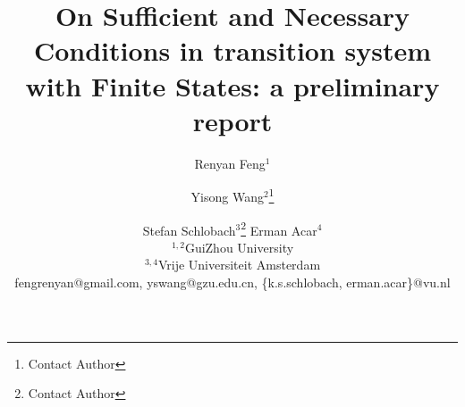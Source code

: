 \documentclass{article}
\title{On Sufficient and Necessary Conditions in transition system\\ with Finite States: a preliminary report}
\author{
Renyan Feng$^1$\and
Yisong Wang$^2$\footnote{Contact Author}\and
Stefan Schlobach$^{3}$\footnote{Contact Author}\And
Erman Acar$^4$\\
\affiliations
$^{1,2}$GuiZhou University\\
$^{3,4}$Vrije Universiteit Amsterdam\\
\emails
fengrenyan@gmail.com,
yswang@gzu.edu.cn,
\{k.s.schlobach, erman.acar\}@vu.nl
}
\begin{document}
\newcommand{\tuple}[1]{{\langle{#1}\rangle}}
\newcommand{\Mod}{\textit{Mod}}
\newcommand\ie{{\it i.e. }}
\newcommand\eg{{\it e.g.}}
\newtheorem{definition}{Definition}
\newtheorem{examp}{Example}
\newenvironment{example}{\begin{examp}\rm}{\end{examp}}
\newtheorem{lemma}{Lemma}
\newtheorem{proposition}{Proposition}
\newtheorem{theorem}{Theorem}
\newtheorem{corollary}[theorem]{Corollary}
\newenvironment{proof}{{\bf Proof:}}{\hfill\rule{2mm}{2mm}\\ }
\newcommand{\rto}{\rightarrow}
\newcommand{\lto}{\leftarrow}
\newcommand{\lrto}{\leftrightarrow}
\newcommand{\Rto}{\Rightarrow}
\newcommand{\Lto}{\Leftarrow}
\newcommand{\LRto}{\Leftrightarrow}
\newcommand{\Var}{\textit{Var}}
\newcommand{\Forget}{\textit{Forget}}
\newcommand{\KForget}{\textit{KForget}}
\newcommand{\TForget}{\textit{TForget}}
\newcommand{\Fst}{\textit{Fst}}
\newcommand{\dep}{\textit{dep}}
\newcommand{\term}{\textit{term}}
\newcommand{\literal}{\textit{literal}}

\newcommand{\Atom}{\mathcal{A}}
\newcommand{\SFive}{\textbf{S5}}
\newcommand{\MPK}{\textsc{k}}
\newcommand{\MPB}{\textsc{b}}
\newcommand{\MPT}{\textsc{t}}
\newcommand{\MPA}{\forall}
\newcommand{\MPE}{\exists}

\newcommand{\DNF}{\textit{DNF}}
\newcommand{\CNF}{\textit{CNF}}

\newcommand{\degree}{\textit{degree}}
\newcommand{\sunfold}{\textit{sunfold}}

\newcommand{\Pos}{\textit{Pos}}
\newcommand{\Neg}{\textit{Neg}}
\newcommand\wrt{{\it w.r.t.}}
\newcommand{\Hm} {{\cal M}}
\newcommand{\Hw} {{\cal W}}
\newcommand{\Hr} {{\cal R}}
\newcommand{\Hb} {{\cal B}}
\newcommand{\Ha} {{\cal A}}

\newcommand{\Dsj}{\triangledown}

\newcommand{\wnext}{\widetilde{\bigcirc}}
\newcommand{\nex}{\bigcirc}
\newcommand{\ness}{\square}
\newcommand{\qness}{\boxminus}
\newcommand{\wqnext}{\widetilde{\circleddash}}
\newcommand{\qnext}{\circleddash}
\newcommand{\may}{\lozenge}
\newcommand{\qmay}{\blacklozenge}
\newcommand{\unt} {{\cal U}}
\newcommand{\since} {{\cal S}}
\newcommand{\SNF} {\textit{SNF$_C$}}
\newcommand{\start}{\textbf{start}}
\newcommand{\Elm}{\textit{Elm}}
\newcommand{\simp}{\textbf{simp}}
\newcommand{\nnf}{\textbf{nnf}}

\newcommand{\CTL}{\textrm{CTL}}
\newcommand{\Ind}{\textrm{Ind}}
\newcommand{\Tran}{\textrm{Tran}}
\newcommand{\Sub}{\textrm{Sub}}
\newcommand{\forget}{{\textsc{f}_\CTL}}
\newcommand{\ALL}{\textsc{a}}
\newcommand{\EXIST}{\textsc{e}}
\newcommand{\NEXT}{\textsc{x}}
\newcommand{\FUTURE}{\textsc{f}}
\newcommand{\UNTIL}{\textsc{u}}
\newcommand{\GLOBAL}{\textsc{g}}
\newcommand{\UNLESS}{\textsc{w}}
\newcommand{\Def}{\textrm{def}}
\newcommand{\IR}{\textrm{IR}}
\newcommand{\Tr}{\textrm{Tr}}
\newcommand{\dis}{\textrm{dis}}
\def\PP{\ensuremath{\textbf{PP}}}
\def\NgP{\ensuremath{\textbf{NP}}}
\def\W{\ensuremath{\textbf{W}}}
\newcommand{\Pre}{\textrm{Pre}}
\newcommand{\Post}{\textrm{Post}}
\end{document}

